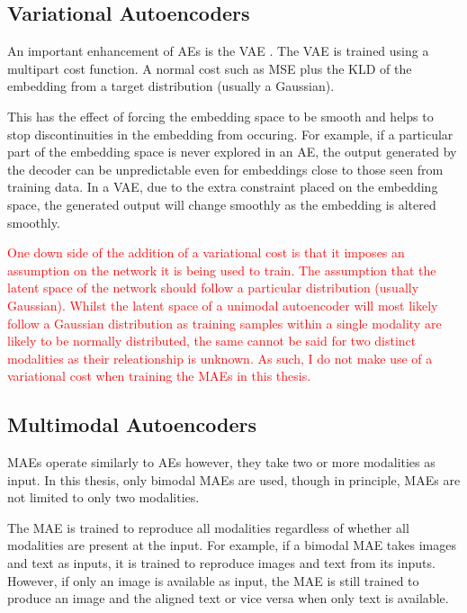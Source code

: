 \subsection{Variational Autoencoders}
An important enhancement of \ac{AE}s is the \ac{VAE} \cite{kingma2013auto}. The \ac{VAE} is trained using a multipart cost function. A normal cost such as \ac{MSE} plus the \ac{KLD} of the embedding from a target distribution (usually a Gaussian).

This has the effect of forcing the embedding space to be smooth and helps to stop discontinuities in the embedding from occuring. For example, if a particular part of the embedding space is never explored in an \ac{AE}, the output generated by the decoder can be unpredictable even for embeddings close to those seen from training data. In a \ac{VAE}, due to the extra constraint placed on the embedding space, the generated output will change smoothly as the embedding is altered smoothly.

\textcolor{red}{One down side of the addition of a variational cost is that it imposes an assumption on the network it is being used to train. The assumption that the latent space of the network should follow a particular distribution (usually Gaussian). 
Whilst the latent space of a unimodal autoencoder will most likely follow a Gaussian distribution as training samples within a single modality are likely to be normally distributed, the same cannot be said for two distinct modalities as their releationship is unknown. As such, I do not make use of a variational cost when training the \acp{MAE} in this thesis.}


\subsection{Multimodal Autoencoders}
\acp{MAE} operate similarly to \ac{AE}s however, they take two or more modalities as input. In this thesis, only bimodal \acp{MAE} are used, though in principle, \acp{MAE} are not limited to only two modalities.

The \ac{MAE} is trained to reproduce all modalities regardless of whether all modalities are present at the input. For example, if a bimodal \ac{MAE} takes images and text as inputs, it is trained to reproduce images and text from its inputs. However, if only an image is available as input, the \ac{MAE} is still trained to produce an image and the aligned text or vice versa when only text is available.


